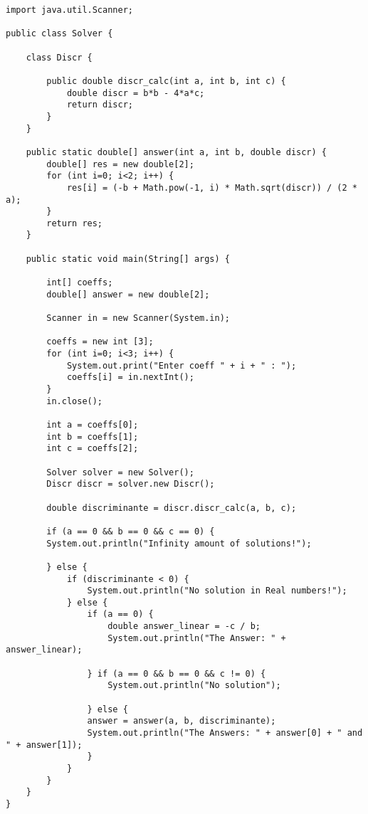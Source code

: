 \documentclass[a4paper]{article}
\begin{document}
\begin{lstlisting}
import java.util.Scanner;

public class Solver {

    class Discr {

        public double discr_calc(int a, int b, int c) {
            double discr = b*b - 4*a*c;
            return discr;
        }
    }

    public static double[] answer(int a, int b, double discr) {
        double[] res = new double[2];
        for (int i=0; i<2; i++) {
            res[i] = (-b + Math.pow(-1, i) * Math.sqrt(discr)) / (2 * a);
        }
        return res;
    }

    public static void main(String[] args) {

        int[] coeffs;
        double[] answer = new double[2];

        Scanner in = new Scanner(System.in);

        coeffs = new int [3];
        for (int i=0; i<3; i++) {
            System.out.print("Enter coeff " + i + " : ");
            coeffs[i] = in.nextInt();
        }
        in.close();

        int a = coeffs[0];
        int b = coeffs[1];
        int c = coeffs[2];

        Solver solver = new Solver();
        Discr discr = solver.new Discr();

        double discriminante = discr.discr_calc(a, b, c);

        if (a == 0 && b == 0 && c == 0) {
        System.out.println("Infinity amount of solutions!");

        } else {
            if (discriminante < 0) {
                System.out.println("No solution in Real numbers!");
            } else {
                if (a == 0) {
                    double answer_linear = -c / b;
                    System.out.println("The Answer: " + answer_linear);
    
                } if (a == 0 && b == 0 && c != 0) {
                    System.out.println("No solution");
    
                } else {
                answer = answer(a, b, discriminante);
                System.out.println("The Answers: " + answer[0] + " and " + answer[1]);
                }
            }
        } 
    }
}
\end{lstlisting}
\end{document}
